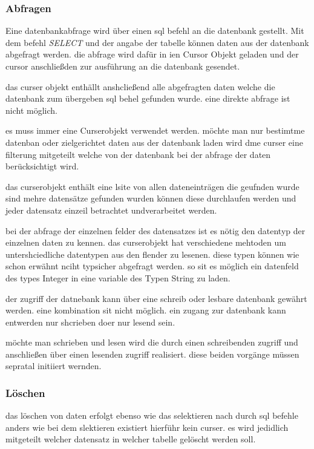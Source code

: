 \subsubsection{Abfragen}
Eine datenbankabfrage wird über einen sql befehl an die datenbank gestellt. Mit dem befehl \textit{SELECT} und der angabe der tabelle können daten aus der datenbank abgefragt werden. die abfrage wird dafür in ien Cursor Objekt geladen und der cursor anschließden zur ausführung an die datenbank gesendet.

das curser objekt enthällt anshcließend alle abgefragten daten welche die datenbank zum übergeben sql behel gefunden wurde. eine direkte abfrage ist nicht möglich.

es muss immer eine Curserobjekt verwendet werden. möchte man nur bestimtme datenban oder zielgerichtet daten aus der datenbank laden wird dme curser eine filterung mitgeteilt welche von der datenbank bei der abfrage der daten berücksichtigt wird.

das curserobjekt enthält eine lsite von allen dateneinträgen die geufnden wurde sind mehre datensätze gefunden wurden können diese durchlaufen werden und jeder datensatz einzeil betrachtet undverarbeitet werden.

bei der abfrage der einzelnen felder des datensatzes ist es nötig den datentyp der einzelnen daten zu kennen. das curserobjekt hat verschiedene mehtoden um untershciedliche datentypen aus den flender zu lesenen. diese typen können wie schon erwähnt nciht typsicher abgefragt werden. so sit es möglich ein datenfeld des types Integer in eine variable des Typen String zu laden.

der zugriff der datnebank kann über eine schreib oder lesbare datenbank gewährt werden. eine kombination sit nicht möglich. ein zugang zur datenbank kann entwerden nur shcrieben doer nur lesend sein.

möchte man schrieben und lesen wird die durch einen schreibenden zugriff und anschließen über einen lesenden zugriff realisiert. diese beiden vorgänge müssen sepratal initiiert wernden.

\subsubsection{Löschen}
das löschen von daten erfolgt ebenso wie das selektieren nach durch sql befehle anders wie bei dem slektieren existiert hierführ kein curser. es wird jedidlich mitgeteilt welcher datensatz in welcher tabelle gelöscht werden soll.

